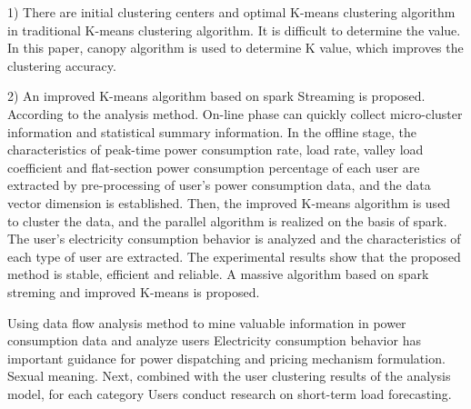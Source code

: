 \documentclass[runningheads]{llncs}
\begin{document}
1) There are initial clustering centers and optimal K-means clustering algorithm in traditional K-means clustering algorithm. It is difficult to determine the value. In this paper, canopy algorithm is used to determine K value, which improves the clustering accuracy.            

2) An improved K-means algorithm based on spark Streaming is proposed. According to the analysis method. On-line phase can quickly collect micro-cluster information and statistical summary information. In the offline stage, the characteristics of peak-time power consumption rate, load rate, valley load coefficient and flat-section power consumption percentage of each user are extracted by pre-processing of user's power consumption data, and the data vector dimension is established. Then, the improved K-means algorithm is used to cluster the data, and the parallel algorithm is realized on the basis of spark. The user's electricity consumption behavior is analyzed and the characteristics of each type of user are extracted. The experimental results show that the proposed method is stable, efficient and reliable. A massive algorithm based on spark streming and improved K-means is proposed. 

Using data flow analysis method to mine valuable information in power consumption data and analyze users Electricity consumption behavior has important guidance for power dispatching and pricing mechanism formulation. Sexual meaning. Next, combined with the user clustering results of the analysis model, for each category Users conduct research on short-term load forecasting. 
\end{document}

